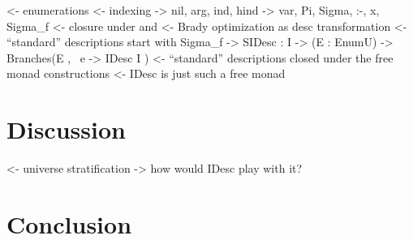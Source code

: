 \documentclass[preprint, authoryear]{sigplanconf}
\newenvironment{structure}{\footnotesize\verbatim}{\endverbatim}
\begin{document}
\begin{structure}
<- enumerations
<- indexing
    -> nil, arg, ind, hind
    -> var, Pi, Sigma, :-, x, Sigma_f
<- closure under \box and \diamond
<- Brady optimization as desc transformation
<- ``standard'' descriptions start with Sigma_f
    -> SIDesc : I -> (E : EnumU) -> Branches(E , \ e -> IDesc I )
<- ``standard'' descriptions closed under the free monad constructions
<- IDesc is just such a free monad
\end{structure}


\section{Discussion}

\begin{structure}
<- universe stratification
    -> how would IDesc play with it?
\end{structure}



\section{Conclusion}

\begin{structure}
\end{structure}















\end{document}

